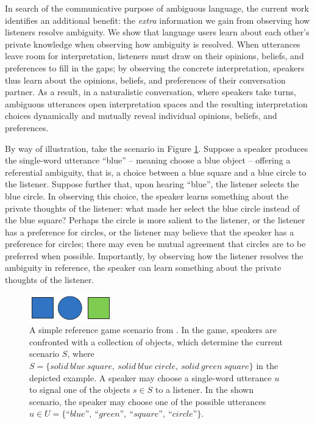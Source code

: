 \documentclass[10pt,a4paper]{article}
\begin{document}
In search of the communicative purpose of ambiguous language, the current work identifies an additional benefit: the \emph{extra} information we gain from observing how listeners resolve ambiguity.
We show that language users learn about each other's private knowledge when observing how ambiguity is resolved. 
When utterances leave room for interpretation, listeners must draw on their opinions, beliefs, and preferences to fill in the gaps;
by observing the concrete interpretation, speakers thus learn about the opinions, beliefs, and preferences of their conversation partner.
As a result, in a naturalistic conversation, where speakers take turns, ambiguous utterances open interpretation spaces and the resulting interpretation choices dynamically and mutually reveal individual opinions, beliefs, and preferences. 


By way of illustration, take the scenario in Figure \ref{FG-ref-game}.
Suppose a speaker produces the single-word utterance ``blue'' -- meaning choose a blue object -- offering a referential ambiguity, that is, a choice between a blue square and a blue circle to the listener. 
Suppose further that, upon hearing ``blue'', the listener selects the blue circle.
In observing this choice, the speaker learns something about the private thoughts of the listener: what made her select the blue circle instead of the blue square? Perhaps the circle is more salient to the listener, or the listener has a preference for circles, or the listener may believe that the speaker has a preference for circles; there may even be mutual agreement that circles are to be preferred when possible. Importantly, by observing how the listener resolves the ambiguity in reference, the speaker can learn something about the private thoughts of the listener.


\begin{figure}
	\centering
	\includegraphics[width=.5\linewidth]{images/rsascene-eps-converted-to.pdf}
	\caption{A simple reference game scenario from \protect{}.
		In the game, speakers are confronted with a collection of objects, which determine the current scenario $S$, where $S=\{solid\ blue\ square,\ solid\ blue\ circle,\ solid\ green\ square\}$ in the depicted example. 
		A speaker may choose a single-word utterance $u$ to signal one of the objects $s\in S$ to a listener.
		In the shown scenario, the speaker may choose one of the possible utterances $u \in U =\{ \textit{``blue''},\ \textit{``green''},\ \textit{``square''},\ \textit{``circle''}\}$.
		}
	\label{FG-ref-game}
\end{figure}
\end{document}
